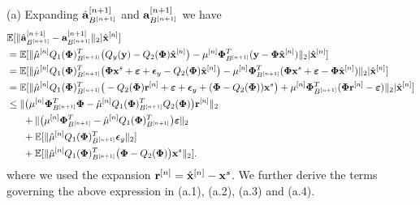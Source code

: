 \documentclass[aoas,preprint]{imsart}
\numberwithin{equation}{section}
\theoremstyle{plain}
\begin{document}
{{(a)} Expanding $\hat{{\bf a}}_{B^{[n+1]}}^{[n+1]}$ and ${{\bf a}}_{B^{[n+1]}}^{[n+1]}$ we have
\begin{equation}\label{quantization_error_terms}
    \begin{split}
      &\mathbb{E}[  \|\hat{{\bf a}}_{B^{[n+1]}}^{[n+1]} - {{\bf a}}_{B^{[n+1]}}^{[n+1]} \|_2| \hat{{\bf x}}^{[n]}] \\
      &= \mathbb{E}[\|\hat{\mu}^{[n]}Q_1({\bf {\bf \Phi}})_{B^{[n+1]}}^T\big(Q_y({\bf y})-Q_2({\bf {\bf \Phi}})\hat{{\bf x}}^{[n]}\big) - {\mu}^{[n]}{\bf {\bf \Phi}}_{B^{[n+1]}}^T({\bf y}-{\bf {\bf \Phi}}\hat{{\bf x}}^{[n]}) \|_2| \hat{{\bf x}}^{[n]}]\\
        &=\mathbb{E}[\|\hat{\mu}^{[n]}Q_1({\bf {\bf \Phi}})_{B^{[n+1]}}^T\big({\bf {\bf \Phi}} {\bf x}^s +\boldsymbol{\varepsilon}+\boldsymbol{\epsilon}_y-Q_2({\bf {\bf \Phi}})\hat{{\bf x}}^{[n]}\big) - {\mu}^{[n]}{\bf {\bf \Phi}}_{B^{[n+1]}}^T({\bf {\bf \Phi}}{\bf x}^s +\boldsymbol{\varepsilon}-{\bf {\bf \Phi}}\hat{{\bf x}}^{[n]}) \|_2| \hat{{\bf x}}^{[n]}]\\
        &=\mathbb{E}[\|\hat{\mu}^{[n]}Q_1({\bf {\bf \Phi}})_{B^{[n+1]}}^T\big(-Q_2({\bf {\bf \Phi}}) {\bf r}^{[n]} +\boldsymbol{\varepsilon}+\boldsymbol{\epsilon}_y+({\bf {\bf \Phi}}-Q_2({\bf {\bf \Phi}})){\bf x}^{s}\big)+{\mu}^{[n]}{\bf {\bf \Phi}}_{B^{[n+1]}}^T({\bf {\bf \Phi}}{\bf r}^{[n]} -\boldsymbol{\varepsilon}) \|_2| \hat{{\bf x}}^{[n]}]\\
        &\leq \|\big(\mu^{[n]}{\bf {\bf \Phi}}_{B^{[n+1]}}^T{\bf {\bf \Phi}} - \hat{\mu}^{[n]}Q_1({\bf {\bf \Phi}})_{B^{[n+1]}}^T Q_2({\bf {\bf \Phi}})\big) {\bf r}^{[n]} \|_2\\
        &\ \ \ \ \  +\|\big(\mu^{[n]}{\bf {\bf \Phi}}_{B^{[n+1]}}^T - \hat{\mu}^{[n]}Q_1({\bf {\bf \Phi}})_{B^{[n+1]}}^T \big)\boldsymbol{\varepsilon} \|_2\\
     &\ \ \ \  \  +\mathbb{E}[\|\hat{\mu}^{[n]}Q_1({\bf {\bf \Phi}})_{B^{[n+1]}}^T\boldsymbol{\epsilon}_y \|_2]\\
     &\ \ \ \  \  +\mathbb{E}[\| \hat{\mu}^{[n]}Q_1({\bf \Phi})_{B^{[n+1]}}^T\big({\bf {\bf \Phi}}-Q_2({\bf {\bf \Phi}})\big){\bf x}^s \|_2].
    \end{split}
\end{equation} where we used the expansion ${{\bf r}}^{[n]} = \hat{{\bf x}}^{[n]}-{\bf x}^s$. We further derive the terms governing the above expression in (a.1), (a.2), (a.3) and (a.4). \\

}
\end{document}
